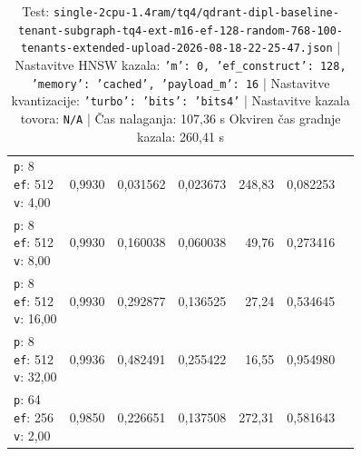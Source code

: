 \begin{table}[htbp]
\begin{tabularx}{\textwidth}{Xrrrrrr}
    \makecell{\texttt{p}: 8\\\texttt{ef}: 512\\\texttt{v}: 4,00} & 0,9930 & 0,031562 & 0,023673 & 248,83 & 0,082253 \\
    \makecell{\texttt{p}: 8\\\texttt{ef}: 512\\\texttt{v}: 8,00} & 0,9930 & 0,160038 & 0,060038 & 49,76 & 0,273416 \\
    \makecell{\texttt{p}: 8\\\texttt{ef}: 512\\\texttt{v}: 16,00} & 0,9930 & 0,292877 & 0,136525 & 27,24 & 0,534645 \\
    \makecell{\texttt{p}: 8\\\texttt{ef}: 512\\\texttt{v}: 32,00} & 0,9936 & 0,482491 & 0,255422 & 16,55 & 0,954980 \\
    \makecell{\texttt{p}: 64\\\texttt{ef}: 256\\\texttt{v}: 2,00} & 0,9850 & 0,226651 & 0,137508 & 272,31 & 0,581643 \\
    \bottomrule
  \end{tabularx}
\caption* {Test: \texttt{single-2cpu-1.4ram/tq4/qdrant-dipl-baseline-tenant-subgraph-tq4-ext-m16-ef-128-random-768-100-tenants-extended-upload-2026-08-18-22-25-47.json} | Nastavitve HNSW kazala: \texttt{{'m': 0, 'ef\_construct': 128, 'memory': 'cached', 'payload\_m': 16}} | Nastavitve kvantizacije: \texttt{{'turbo': {'bits': 'bits4'}}} | Nastavitve kazala tovora: \texttt{N/A} | Čas nalaganja: 107,36 s Okviren čas gradnje kazala: 260,41 s}\end{table}


